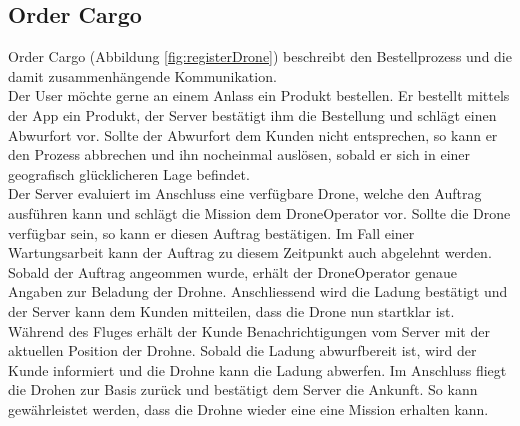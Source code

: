 \subsection{Order Cargo}

Order Cargo (Abbildung \ref{fig:registerDrone}) beschreibt den Bestellprozess und die damit zusammenhängende Kommunikation. \\
Der User möchte gerne an einem Anlass ein Produkt bestellen. Er bestellt mittels der App ein Produkt, der Server bestätigt ihm die Bestellung und schlägt einen Abwurfort vor. Sollte der Abwurfort dem Kunden nicht entsprechen, so kann er den Prozess abbrechen und ihn nocheinmal auslösen, sobald er sich in einer geografisch glücklicheren Lage befindet.
\\
Der Server evaluiert im Anschluss eine verfügbare Drone, welche den Auftrag ausführen kann und schlägt die Mission dem DroneOperator vor. Sollte die Drone verfügbar sein, so kann er diesen Auftrag bestätigen. Im Fall einer Wartungsarbeit kann der Auftrag zu diesem Zeitpunkt auch abgelehnt werden. Sobald der Auftrag angeommen wurde, erhält der DroneOperator genaue Angaben zur Beladung der Drohne. Anschliessend wird die Ladung bestätigt und der Server kann dem Kunden mitteilen, dass die Drone nun startklar ist. Während des Fluges erhält der Kunde Benachrichtigungen vom Server mit der aktuellen Position der Drohne. Sobald die Ladung abwurfbereit ist, wird der Kunde informiert und die Drohne kann die Ladung abwerfen. Im Anschluss fliegt die Drohen zur Basis zurück und bestätigt dem Server die Ankunft. So kann gewährleistet werden, dass die Drohne wieder eine eine Mission erhalten kann.
%